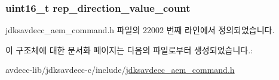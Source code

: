 \subsubsection[{\texorpdfstring{rep\+\_\+direction\+\_\+value\+\_\+count}{rep_direction_value_count}}]{\setlength{\rightskip}{0pt plus 5cm}uint16\+\_\+t rep\+\_\+direction\+\_\+value\+\_\+count}\hypertarget{structjdksavdecc__aem__command__set__matrix__response_ad43e01e546f8431400084a400bc17c47}{}\label{structjdksavdecc__aem__command__set__matrix__response_ad43e01e546f8431400084a400bc17c47}


jdksavdecc\+\_\+aem\+\_\+command.\+h 파일의 22002 번째 라인에서 정의되었습니다.



이 구조체에 대한 문서화 페이지는 다음의 파일로부터 생성되었습니다.\+:\begin{DoxyCompactItemize}
\item 
avdecc-\/lib/jdksavdecc-\/c/include/\hyperlink{jdksavdecc__aem__command_8h}{jdksavdecc\+\_\+aem\+\_\+command.\+h}\end{DoxyCompactItemize}
